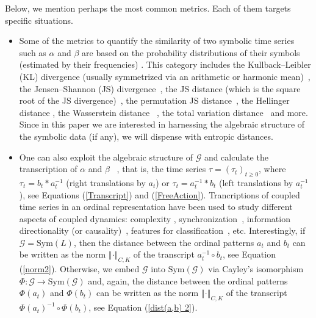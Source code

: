 \documentclass{article}
\begin{document}
\label{sec:Metrics}

Below, we mention perhaps the most common metrics. Each of them targets
specific situations.

\begin{itemize}
\item[\textbf{(i)}] Some of the metrics to quantify the similarity of two symbolic
time series such as $\alpha $ and $\beta $ are based on the probability
distributions of their symbols (estimated by their frequencies) \cite%
{Rachev2013}. This category includes the Kullback--Leibler (KL) divergence
(usually symmetrized via an arithmetic or harmonic mean)~\cite{Monetti2009},
the Jensen--Shannon (JS) divergence~\cite{Lin1991}, the JS distance (which is
the square root of the JS divergence)~\cite{Endres2003}, the permutation JS
distance~\cite{Zunino2022,Zunino2024}, the Hellinger distance \cite%
{Hellinger1909}, the Wasserstein distance~\cite{Kantorovich1942,Figalli2021}%
, the total variation distance~\cite{Pinsker1964,Bhattacharyya2023} and
more. Since in this paper we are interested in harnessing the algebraic
structure of the symbolic data (if any), we will dispense with entropic
distances.

\item[\textbf{(ii)}] One can also exploit the algebraic structure of $\mathcal{G}$
and calculate the transcription of $\alpha $ and $\beta $~\cite{Monetti2009}%
, that is, the time series $\tau =(\tau _{t})_{t\geq 0}$, where $\tau
_{t}=b_{t}\ast a_{t}^{-1}$ (right translations by $a_{t}$) or $\tau
_{t}=a_{t}^{-1}\ast b_{t}$ (left translations by $a_{t}^{-1}$), see
Equations (\ref{Transcript}) and (\ref{FreeAction}). Trancriptions of
coupled time series in an ordinal representation have been used to study
different aspects of coupled dynamics: complexity \cite%
{Monetti2009,Amigo2012}, synchronization~\cite{Monetti2009,Amigo2012},
information directionality (or causality)~\cite{Monetti2013B}, features for
classification~\cite{Pilarczyk2023}, etc. Interestingly, if $\mathcal{G}=%
\mathrm{Sym}(L)$, then the distance between the ordinal patterns $a_{t}$ and 
$b_{t}$ can be written as the norm $\left\Vert \cdot \right\Vert _{C,K}$ of
the transcript $a_{t}^{-1}\circ b_{t}$, see Equation (\ref{norm2}).
Otherwise, we embed $\mathcal{G}$ into $\mathrm{Sym}(\mathcal{G})$ via
Cayley's isomorphism $\Phi :\mathcal{G}\rightarrow \mathrm{Sym}(\mathcal{G})$
and, again, the distance between the ordinal patterns $\Phi (a_{t})$ and $%
\Phi (b_{t})$ can be written as the norm $\left\Vert \cdot \right\Vert
_{C,K} $ of the transcript $\Phi (a_{t})^{-1}\circ \Phi (b_{t})$, see
Equation (\ref{dist(a,b) 2}).


\end{itemize}
\end{document}
